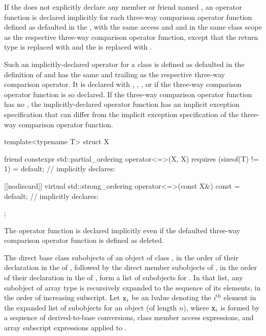 \pnum
If the 
does not explicitly declare
any member or friend named ,
an \tcode{==} operator function is declared implicitly
for each three-way comparison operator function
defined as defaulted in the ,
with the same access and  and
in the same class scope as
the respective three-way comparison operator function,
except that the return type is replaced with  and
the  is replaced with .
\begin{note}
Such an implicitly-declared \tcode{==} operator for a class 
is defined as defaulted
in the definition of  and
has the same  and
trailing  as
the respective three-way comparison operator.
It is declared with , , ,
or  if
the three-way comparison operator function is so declared.
If the three-way comparison operator function
has no ,
the implicitly-declared \tcode{==} operator function
has an implicit exception specification that
can differ from the implicit exception specification of
the three-way comparison operator function.
\end{note}
\begin{example}
\begin{codeblock}
template<typename T> struct X {
  friend constexpr std::partial_ordering operator<=>(X, X) requires (sizeof(T) != 1) = default;
  // implicitly declares: 

  [[nodiscard]] virtual std::strong_ordering operator<=>(const X&) const = default;
  // implicitly declares: 
};
\end{codeblock}
\end{example}
\begin{note}
The \tcode{==} operator function is declared implicitly even if
the defaulted three-way comparison operator function
is defined as deleted.
\end{note}

\pnum
The direct base class subobjects of an object  of class ,
in the order of their declaration in the  of ,
followed by the direct member subobjects of ,
in the order of their declaration in the  of ,
form a list of subobjects for .
In that list, any subobject of array type is recursively expanded
to the sequence of its elements, in the order of increasing subscript.
Let $\tcode{x}_i$ be an lvalue denoting the $i^\text{th}$ element
in the expanded list of subobjects for an object 
(of length $n$),
where $\tcode{x}_i$ is
formed by a sequence of
derived-to-base conversions,
class member access expressions, and
array subscript expressions applied to .

